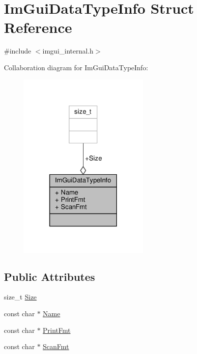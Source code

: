 \hypertarget{structImGuiDataTypeInfo}{}\section{Im\+Gui\+Data\+Type\+Info Struct Reference}
\label{structImGuiDataTypeInfo}


{\ttfamily \#include $<$imgui\+\_\+internal.\+h$>$}



Collaboration diagram for Im\+Gui\+Data\+Type\+Info\+:
\nopagebreak
\begin{figure}[H]
\begin{center}
\leavevmode
\includegraphics[width=182pt]{structImGuiDataTypeInfo__coll__graph}
\end{center}
\end{figure}
\subsection*{Public Attributes}
\begin{DoxyCompactItemize}
\item 
size\+\_\+t \hyperlink{structImGuiDataTypeInfo_a49a2b2d99b93b7db968a74d92380ecbf}{Size}
\item 
const char $\ast$ \hyperlink{structImGuiDataTypeInfo_aa5c27272fbfabde6b42f1bfe19d1a730}{Name}
\item 
const char $\ast$ \hyperlink{structImGuiDataTypeInfo_aa66ad5a40cbfe164121fcd0f35abd438}{Print\+Fmt}
\item 
const char $\ast$ \hyperlink{structImGuiDataTypeInfo_aaa2d211e7cc5f03786f82650b69e9cf3}{Scan\+Fmt}
\end{DoxyCompactItemize}


